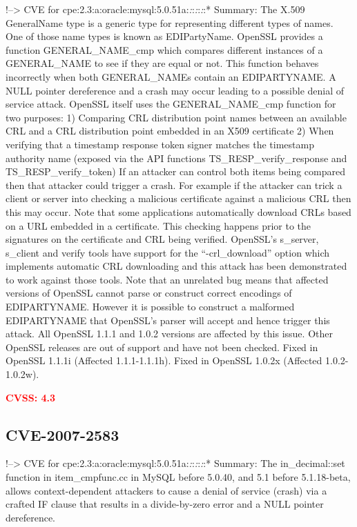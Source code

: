 \documentclass[a4paper, 12pt]{article}
\begin{document}
!--\textgreater{} CVE for
cpe:2.3:a:oracle:mysql:5.0.51a:\emph{:}:\emph{:}:\emph{:}:* Summary: The
X.509 GeneralName type is a generic type for representing different
types of names. One of those name types is known as EDIPartyName.
OpenSSL provides a function GENERAL\_NAME\_cmp which compares different
instances of a GENERAL\_NAME to see if they are equal or not. This
function behaves incorrectly when both GENERAL\_NAMEs contain an
EDIPARTYNAME. A NULL pointer dereference and a crash may occur leading
to a possible denial of service attack. OpenSSL itself uses the
GENERAL\_NAME\_cmp function for two purposes: 1) Comparing CRL
distribution point names between an available CRL and a CRL distribution
point embedded in an X509 certificate 2) When verifying that a timestamp
response token signer matches the timestamp authority name (exposed via
the API functions TS\_RESP\_verify\_response and
TS\_RESP\_verify\_token) If an attacker can control both items being
compared then that attacker could trigger a crash. For example if the
attacker can trick a client or server into checking a malicious
certificate against a malicious CRL then this may occur. Note that some
applications automatically download CRLs based on a URL embedded in a
certificate. This checking happens prior to the signatures on the
certificate and CRL being verified. OpenSSL's s\_server, s\_client and
verify tools have support for the ``-crl\_download'' option which
implements automatic CRL downloading and this attack has been
demonstrated to work against those tools. Note that an unrelated bug
means that affected versions of OpenSSL cannot parse or construct
correct encodings of EDIPARTYNAME. However it is possible to construct a
malformed EDIPARTYNAME that OpenSSL's parser will accept and hence
trigger this attack. All OpenSSL 1.1.1 and 1.0.2 versions are affected
by this issue. Other OpenSSL releases are out of support and have not
been checked. Fixed in OpenSSL 1.1.1i (Affected 1.1.1-1.1.1h). Fixed in
OpenSSL 1.0.2x (Affected 1.0.2-1.0.2w).

\textbf{\textcolor{red}{CVSS: 4.3}}

\hypertarget{cve-2007-2583}{%
\subsection{CVE-2007-2583}\label{cve-2007-2583}}

!--\textgreater{} CVE for
cpe:2.3:a:oracle:mysql:5.0.51a:\emph{:}:\emph{:}:\emph{:}:* Summary: The
in\_decimal::set function in item\_cmpfunc.cc in MySQL before 5.0.40,
and 5.1 before 5.1.18-beta, allows context-dependent attackers to cause
a denial of service (crash) via a crafted IF clause that results in a
divide-by-zero error and a NULL pointer dereference.
\end{document}
